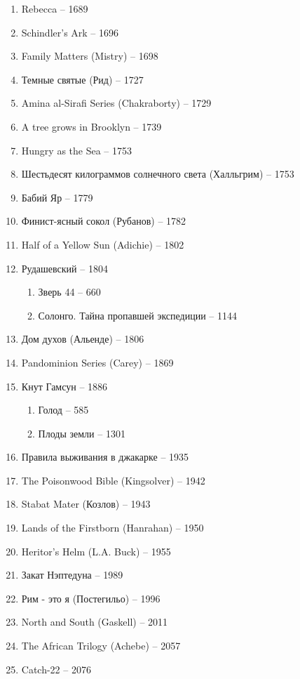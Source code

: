 \documentclass[a4paper, 11pt]{proc} %
\begin{document}
\begin{enumerate}
    \item Rebecca -- 1689
    \item Schindler's Ark -- 1696
    \item Family Matters (Mistry) -- 1698
    \item Темные святые (Рид) -- 1727
    \item Amina al-Sirafi Series (Chakraborty) -- 1729
    \item A tree grows in Brooklyn -- 1739
    \item Hungry as the Sea -- 1753
    \item Шестьдесят килограммов солнечного света (Халльгрим) -- 1753
    \item Бабий Яр -- 1779
    \item Финист-ясный сокол (Рубанов) -- 1782
    \item Half of a Yellow Sun (Adichie) -- 1802
    \item Рудашевский -- 1804
        \begin{enumerate}
            \item Зверь 44 -- 660
            \item Солонго. Тайна пропавшей экспедиции -- 1144
        \end{enumerate}
    \item Дом духов (Альенде) -- 1806
    \item Pandominion Series (Carey) -- 1869
    \item Кнут Гамсун -- 1886
        \begin{enumerate}
            \item Голод -- 585
            \item Плоды земли -- 1301
        \end{enumerate}
    \item Правила выживания в джакарке -- 1935
    \item The Poisonwood Bible (Kingsolver) -- 1942
    \item Stabat Mater (Козлов) -- 1943
    \item Lands of the Firstborn (Hanrahan) -- 1950
    \item Heritor's Helm (L.A. Buck) -- 1955
    \item Закат Нэптедуна -- 1989
    \item Рим - это я (Постегильо) -- 1996
    \item North and South (Gaskell) -- 2011
    \item The African Trilogy (Achebe) -- 2057
    \item Catch-22 -- 2076

\end{enumerate}
\end{document}
